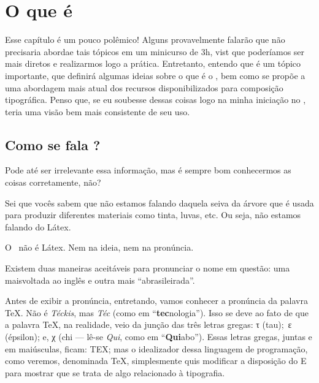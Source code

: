 \chapter{O que é \LaTeXX} 
\label{cap:LaTeX}

Esse capítulo é um pouco polêmico!
Alguns provavelmente falarão que não precisaria abordae tais tópicos em um 
minicurso de 3\unit{h}, vist que poderíamos ser mais diretos e realizarmos 
logo a prática. 
Entretanto, entendo que é um tópico importante, que definirá algumas ideias 
sobre o que é o \LaTeXX, bem como se propõe a uma abordagem mais atual dos 
recursos disponibilizados para composição tipográfica. 
Penso que, se eu soubesse dessas coisas logo na minha iniciação no \LaTeXX, 
teria uma visão bem mais consistente de seu uso. 


\section{Como se fala \LaTeXX?}
\label{sec:como-se-fala}

Pode até ser irrelevante essa informação, mas é sempre bom conhecermos as 
coisas corretamente, não? 

Sei que vocês sabem que não estamos falando daquela seiva da árvore que é 
usada para produzir diferentes materiais como tinta, luvas, etc. 
Ou seja, não estamos falando do Látex. 

O \LaTeXX\ não é Látex. 
Nem na ideia, nem na pronúncia. 

Existem duas maneiras aceitáveis para pronunciar o nome em questão: uma maisvoltada ao inglês e outra mais ``abrasileirada''. 

Antes de exibir a pronúncia, entretando, vamos conhecer a pronúncia da 
palavra \TeX.
Não é \textit{Téckis}, mas \textit{Téc} (como em ``\textbf{tec}nologia''). 
Isso se deve ao fato de que a palavra \TeX, na realidade, veio da junção 
das três letras gregas: {\grega τ} (tau);\, {\grega ε} (épsilon); e, 
{\grega χ} (chi --- lê-se \textit{Qui}, como em ``\textbf{Qui}abo'').
Essas letras gregas, juntas e em maiúsculas, ficam: {\grega ΤΕΧ}; mas o 
idealizador dessa linguagem de programação, como veremos, denominada \TeX, 
simplesmente quis modificar a disposição do {\grega Ε} para mostrar que se 
trata de algo relacionado à tipografia.

